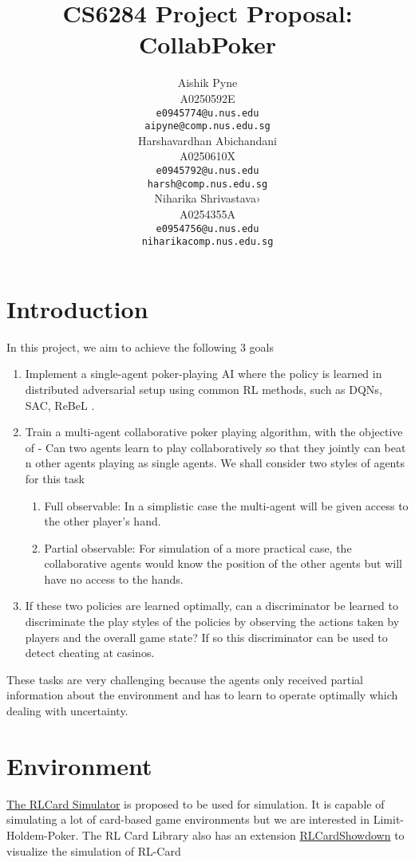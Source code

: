 \documentclass[10pt]{article}
\title{CS6284 Project Proposal: CollabPoker}
\author{
  Aishik Pyne \\
      A0250592E \\
      {\tt e0945774@u.nus.edu} \\
      {\tt aipyne@comp.nus.edu.sg} \\\And
  Harshavardhan Abichandani \\
      A0250610X \\
      {\tt e0945792@u.nus.edu} \\
      {\tt harsh@comp.nus.edu.sg} \\\And
  Niharika Shrivastava› \\
      A0254355A \\
      {\tt e0954756@u.nus.edu} \\
      {\tt niharikacomp.nus.edu.sg}}
\date{}
\begin{document}
\maketitle




\section{Introduction}
In this project, we aim to achieve the following 3 goals
\begin{enumerate}
    \item Implement a single-agent poker-playing AI where the policy is learned in distributed adversarial setup using common RL methods, such as DQNs, SAC, ReBeL \cite{DBLP:journals/corr/abs-2007-13544}.
    
    \item Train a multi-agent collaborative poker playing algorithm, with the objective of - Can two agents learn to play collaboratively so that they jointly can beat n other agents playing as single agents. We shall consider two styles of agents for this task
    \begin{enumerate}
        \item Full observable: In a simplistic case the multi-agent will be given access to the other player's hand.
        \item Partial observable:  For simulation of a more practical case, the collaborative agents would know the position of the other agents but will have no access to the hands. 
    \end{enumerate}
    
    \item If these two policies are learned optimally, can a discriminator be learned to discriminate the play styles of the policies by observing the actions taken by players and the overall game state? If so this discriminator can be used to detect cheating at casinos.
\end{enumerate}
These tasks are very challenging because the agents only received partial information about the environment and has to learn to operate optimally which dealing with uncertainty.

\section{Environment}
\href{https://github.com/datamllab/rlcard}{The RLCard Simulator} is proposed to be used for simulation. It is capable of simulating a lot of card-based game environments but we are interested in Limit-Holdem-Poker. The RL Card Library also has an extension \href{https://github.com/datamllab/rlcard-showdown}{RLCardShowdown} to visualize the simulation of RL-Card
\end{document}
